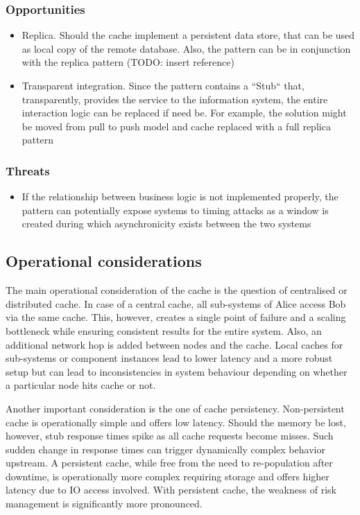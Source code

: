 \documentclass[10pt,a4paper]{article}
\begin{document}
\subsubsection{Opportunities}	
	 	\begin{itemize}
			\item Replica. Should the cache implement a persistent data store, that can be used as local copy of the remote database. Also, the pattern can be in conjunction with the replica pattern (TODO: insert reference)
			\item Transparent integration. Since the pattern contains a ``Stub`` that, transparently, provides the service to the information system, the entire interaction logic can be replaced if need be. For example, the solution might be moved from pull to push model and cache replaced with a full replica pattern
		\end{itemize}
		
\subsubsection{Threats}	
	 	\begin{itemize}
			\item If the relationship between business logic is not implemented properly, the pattern can potentially expose systems to timing attacks as a window is created during which asynchronicity exists between the two systems
		\end{itemize}

\subsection{Operational considerations}
The main operational consideration of the cache is the question of centralised or distributed cache. In case of a central cache, all sub-systems of Alice access Bob via the same cache. This, however, creates a single point of failure and a scaling bottleneck while ensuring consistent results for the entire system. Also, an additional network hop is added between nodes and the cache. Local caches for sub-systems or component instances lead to lower latency and a more robust setup but can lead to inconsistencies in system behaviour depending on whether a particular node hits cache or not. 

Another important consideration is the one of cache persistency. Non-persistent cache is operationally simple and offers low latency. Should the memory be lost, however, stub response times spike as all cache requests become misses. Such sudden change in response times can trigger dynamically complex behavior upstream. A persistent cache, while free from the need to re-population after downtime, is operationally more complex requiring storage and offers higher latency due to IO access involved. With persistent cache, the weakness of risk management is significantly more pronounced.
\end{document}
